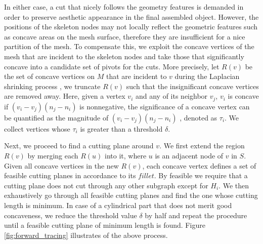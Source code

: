 In either case, a cut that nicely follows the geometry features is demanded in order to preserve aesthetic appearance in the final assembled object. However, the positions of the skeleton nodes may not locally reflect the geometric features such as concave areas on the mesh surface, therefore they are insufficient for a nice partition of the mesh. To compensate this, we exploit the concave vertices of the mesh that are incident to the skeleton nodes and take those that significantly concave into a candidate set of pivots for the cuts. More precisely, let $R(v)$ be the set of concave vertices on $M$ that are incident to $v$ during the Laplacian shrinking process \cite{AuTCCL08}, we truncate $R(v)$ such that the insignificant concave vertices are removed away. Here, given a vertex $v_i$ and any of its neighbor $v_j$, $v_i$ is concave if $(v_i - v_j)(n_j - n_i)$ is nonnegative, the significance of a concave vertex can be quantified as the magnitude of $(v_i - v_j)(n_j - n_i)$ \cite{au2012mesh}, denoted as $\tau_i$. We collect vertices whose $\tau_i$ is greater than a threshold $\delta$.



Next, we proceed to find a cutting plane around $v$. We first extend the region $R(v)$ by merging each $R(u)$ into it, where $u$ is an adjacent node of $v$ in $S$. Given all concave vertices in the new $R(v)$, each concave vertex defines a set of feasible cutting planes in accordance to its $fillet$. By feasible we require that a cutting plane does not cut through any other subgraph except for $H_i$. We then exhaustively go through all feasible cutting planes and find the one whose cutting length is minimum. In case of a cylindrical part that does not merit good concaveness, we reduce the threshold value $\delta$ by half and repeat the procedure until a feasible cutting plane of minimum length is found. Figure \ref{fig:forward_tracing} illustrates of the above process.



